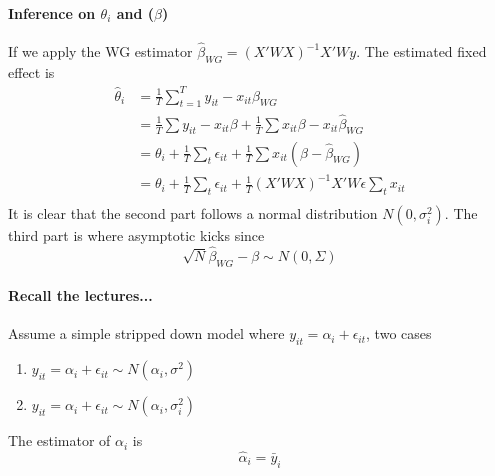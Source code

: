 \paragraph{Inference on $\theta_i$ and ($\beta$)}
If we apply the WG estimator $\hat{\beta}_{WG}= (X'WX)^{-1}X'W y$. The
estimated fixed effect is \begin{equation*}
    \begin{split}
        \hat{\theta}_i &= \frac{1}{T}\sum_{t=1}^T y_{it}-x_{it}\hat{\beta}_{WG}\\
        &= \frac{1}{T}\sum y_{it}-x_{it}\beta+\frac{1}{T}\sum x_{it}\beta-x_{it}\hat{\beta}_{WG}\\
        &= \theta_i+\frac{1}{T}\sum_t \epsilon_{it} + \frac{1}{T}\sum x_{it}(\beta-\hat{\beta}_{WG})\\
        & = \theta_i + \frac{1}{T}\sum_t \epsilon_{it} + \frac{1}{T}(X'WX)^{-1}X'W\epsilon \sum_t x_{it}\\
    \end{split}
\end{equation*}
It is clear that the second part follows a normal distribution $N(0, \sigma_i^2)$. The third part is where asymptotic kicks since \begin{equation*}
    \sqrt{N}\hat{\beta}_{WG} -\beta \sim N(0, \Sigma)
\end{equation*}

\paragraph{Recall the lectures...}
Assume a simple stripped down model where $y_{it}=\alpha_i+\epsilon_{it}$, two
cases \begin{enumerate}
    \item $y_{it}=\alpha_i+\epsilon_{it} \sim N(\alpha_i,\sigma^2)$
    \item $y_{it}=\alpha_i+\epsilon_{it} \sim N(\alpha_i,\sigma_i^2)$
\end{enumerate}
The estimator of $\alpha_i$ is \begin{equation*}
    \hat{\alpha}_i = \bar{y}_i
\end{equation*}

